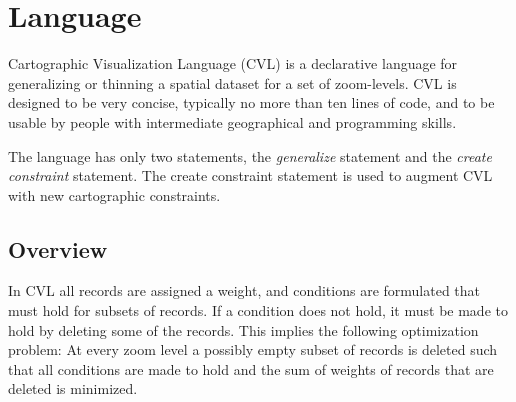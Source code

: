 \section{Language}
\label{sec:cvl-language}
Cartographic Visualization Language (CVL) is a declarative language for generalizing or thinning a spatial dataset for a set of zoom-levels. CVL is designed to be very concise, typically no more than ten lines of code, and to be usable by people with intermediate geographical and programming skills.



The language has only two statements, the \emph{generalize} statement and the \emph{create constraint} statement. The create constraint statement is used to augment CVL with new cartographic constraints.

\subsection{Overview}



In CVL all records are assigned a weight, and conditions are formulated that must hold for subsets of records. If a condition does not hold, it must be made to hold by deleting some of the records. This implies the following optimization problem: At every zoom level a possibly empty subset of records is deleted such that all conditions are made to hold and the sum of weights of records that are deleted is minimized.


